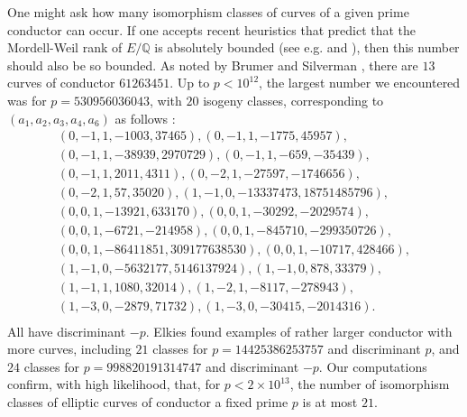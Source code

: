 One might ask how many isomorphism classes of curves of a given prime conductor can occur. If one accepts recent 
heuristics that predict that the Mordell-Weil rank of $E/\mathbb{Q}$ is absolutely bounded (see e.g. \cite{PPVW} and \cite{Watetal}), then this number should also be so bounded. As noted by Brumer and Silverman \cite{BrSi}, 
there are $13$ curves of conductor $61263451$. Up to $p < 10^{12}$, the largest number we encountered was for $ p=530956036043$,
with $20$ isogeny classes, corresponding to $(a_1,a_2,a_3,a_4,a_6)$ as follows :
 $$
 \begin{array}{l}
 \left( 0, -1, 1, -1003, 37465 \right), \left( 0, -1, 1, -1775, 45957 \right), \\
 \left( 0, -1, 1, -38939, 2970729 \right), \left( 0, -1, 1, -659, -35439 \right), \\
 \left(0, -1, 1, 2011, 4311\right), \left(0, -2, 1, -27597, -1746656\right),\\
\left( 0, -2, 1, 57, 35020\right),  \left(1, -1, 0, -13337473,18751485796\right),\\
\left(0, 0, 1, -13921, 633170\right), \left( 0, 0, 1, -30292,-2029574\right),\\
\left(0, 0, 1, -6721, -214958\right), \left(0, 0, 1, -845710, -299350726\right), \\
\left( 0, 0, 1, -86411851, 309177638530\right),  \left(0,0, 1, -10717, 428466\right), \\
\left(1, -1, 0, -5632177, 5146137924\right), \left( 1, -1, 0, 878,33379\right),  \\
 \left(1, -1, 1, 1080, 32014\right), \left(1, -2, 1, -8117, -278943\right), \\
\left(1, -3, 0, -2879, 71732\right), \left(1, -3, 0, -30415, -2014316\right). \\
\end{array}
$$
  All have discriminant $-p$.
 Elkies \cite{Elk1} found examples of rather larger conductor with more curves, including
 $21$ classes for $p=14425386253757$ and discriminant $p$, and $24$ classes for $p=998820191314747$ and discriminant $-p$. Our computations confirm, with high likelihood, that, for $p < 2 \times 10^{13}$, the number of isomorphism classes of elliptic curves of conductor a fixed prime $p$ is at most $21$.
 
